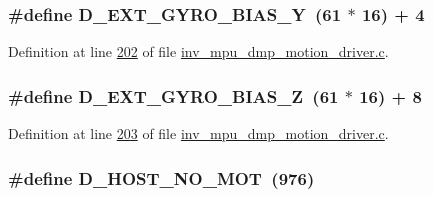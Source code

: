 \subsubsection[{\texorpdfstring{D\+\_\+\+E\+X\+T\+\_\+\+G\+Y\+R\+O\+\_\+\+B\+I\+A\+S\+\_\+Y}{D_EXT_GYRO_BIAS_Y}}]{\setlength{\rightskip}{0pt plus 5cm}\#define D\+\_\+\+E\+X\+T\+\_\+\+G\+Y\+R\+O\+\_\+\+B\+I\+A\+S\+\_\+Y~(61 $\ast$ 16) + 4}\hypertarget{group___d_r_i_v_e_r_s_ga6de6f7302f19c1f63f1a04b51ff14b1a}{}\label{group___d_r_i_v_e_r_s_ga6de6f7302f19c1f63f1a04b51ff14b1a}


Definition at line \hyperlink{inv__mpu__dmp__motion__driver_8c_source_l00202}{202} of file \hyperlink{inv__mpu__dmp__motion__driver_8c_source}{inv\+\_\+mpu\+\_\+dmp\+\_\+motion\+\_\+driver.\+c}.

\subsubsection[{\texorpdfstring{D\+\_\+\+E\+X\+T\+\_\+\+G\+Y\+R\+O\+\_\+\+B\+I\+A\+S\+\_\+Z}{D_EXT_GYRO_BIAS_Z}}]{\setlength{\rightskip}{0pt plus 5cm}\#define D\+\_\+\+E\+X\+T\+\_\+\+G\+Y\+R\+O\+\_\+\+B\+I\+A\+S\+\_\+Z~(61 $\ast$ 16) + 8}\hypertarget{group___d_r_i_v_e_r_s_gacd6dead1c0b0458f1ec5d66914a1cf90}{}\label{group___d_r_i_v_e_r_s_gacd6dead1c0b0458f1ec5d66914a1cf90}


Definition at line \hyperlink{inv__mpu__dmp__motion__driver_8c_source_l00203}{203} of file \hyperlink{inv__mpu__dmp__motion__driver_8c_source}{inv\+\_\+mpu\+\_\+dmp\+\_\+motion\+\_\+driver.\+c}.

\subsubsection[{\texorpdfstring{D\+\_\+\+H\+O\+S\+T\+\_\+\+N\+O\+\_\+\+M\+OT}{D_HOST_NO_MOT}}]{\setlength{\rightskip}{0pt plus 5cm}\#define D\+\_\+\+H\+O\+S\+T\+\_\+\+N\+O\+\_\+\+M\+OT~(976)}\hypertarget{group___d_r_i_v_e_r_s_ga0ee24f50eee31a512b652647521d24bb}{}\label{group___d_r_i_v_e_r_s_ga0ee24f50eee31a512b652647521d24bb}


